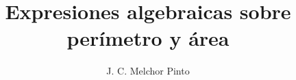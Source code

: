 \documentclass[12pt]{guia}
\title{Expresiones algebraicas sobre perímetro y área}
\author{J. C. Melchor Pinto}
\begin{document}
\pagestyle{headandfoot}
\addpoints
\INFO
\printanswers
\begin{questions}
    \questionboxed[5]{}
    \questionboxed[5]{}
    \questionboxed[5]{}
    \questionboxed[5]{}
    \questionboxed[10]{}
    \questionboxed[5]{}
    \questionboxed[10]{}
    \questionboxed[5]{}
    \questionboxed[5]{}
    \questionboxed[5]{}
    \questionboxed[5]{}
    \questionboxed[5]{}
    \questionboxed[5]{}
    \questionboxed[5]{}
    \questionboxed[10]{}
    \questionboxed[10]{}
\end{questions}
\end{document}
